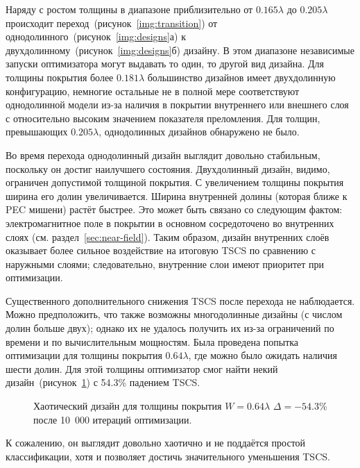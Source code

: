 Наряду с ростом толщины в диапазоне приблизительно от ${0.165\lambda}$
до ${0.205\lambda}$ происходит переход~(рисунок~\ref{img:transition})
от однодолинного~(рисунок~\ref{img:designs}а) к
двухдолинному~(рисунок~\ref{img:designs}б) дизайну. В этом диапазоне
независимые запуски оптимизатора могут выдавать то один, то другой вид
дизайна.  Для толщины покрытия более ${0.181\lambda}$ большинство
дизайнов имеет двухдолинную конфигурацию, немногие остальные не в
полной мере соответствуют однодолинной модели из-за наличия в покрытии
внутреннего или внешнего слоя с относительно высоким значением
показателя преломления. Для толщин, превышающих ${0.205\lambda}$,
однодолинных дизайнов обнаружено не было.

Во время перехода однодолинный дизайн выглядит довольно стабильным,
поскольку он достиг наилучшего состояния. Двухдолинный дизайн, видимо,
ограничен допустимой толщиной покрытия. С увеличением толщины покрытия
ширина его долин увеличивается. Ширина внутренней долины (которая
ближе к PEC мишени) растёт быстрее. Это может быть связано со
следующим фактом: электромагнитное поле в покрытии в основном
сосредоточено во внутренних слоях
(см. раздел~\ref{sec:near-field}). Таким образом, дизайн внутренних
слоёв оказывает более сильное воздействие на итоговую TSCS по
сравнению с наружными слоями; следовательно, внутренние слои имеют
приоритет при оптимизации.

Существенного дополнительного снижения TSCS после перехода не
наблюдается. Можно предположить, что также возможны многодолинные
дизайны (с числом долин больше двух); однако их не удалось получить их
из-за ограничений по времени и по вычислительным мощностям. Была
проведена попытка оптимизации для толщины покрытия $0.64\lambda$, где
можно было ожидать наличия шести долин. Для этой толщины оптимизатор
смог найти некий дизайн~(рисунок~\ref{fig:thick}) с 54.3\% падением
TSCS.
\begin{figure}
  \caption{Хаотический дизайн для толщины покрытия $W=0.64\lambda$
    $\Delta =-54.3$\% после 10~000 итераций оптимизации.
    \label{fig:thick}}%
\end{figure}
К сожалению, он выглядит довольно хаотично и не поддаётся простой
классификации, хотя и позволяет достичь значительного уменьшения
TSCS.

